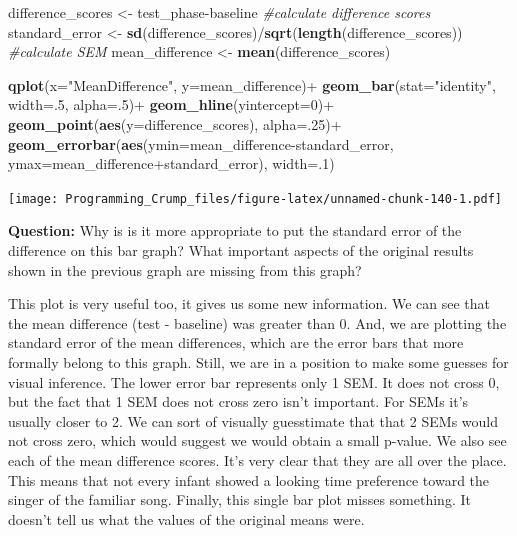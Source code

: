 \documentclass[]{book}
\newenvironment{Shaded}{\begin{snugshade}}{\end{snugshade}}
\newcommand{\KeywordTok}[1]{\textcolor[rgb]{0.13,0.29,0.53}{\textbf{{#1}}}}
\newcommand{\DataTypeTok}[1]{\textcolor[rgb]{0.13,0.29,0.53}{{#1}}}
\newcommand{\DecValTok}[1]{\textcolor[rgb]{0.00,0.00,0.81}{{#1}}}
\newcommand{\StringTok}[1]{\textcolor[rgb]{0.31,0.60,0.02}{{#1}}}
\newcommand{\CommentTok}[1]{\textcolor[rgb]{0.56,0.35,0.01}{\textit{{#1}}}}
\newcommand{\NormalTok}[1]{{#1}}
\theoremstyle{definition}
\theoremstyle{definition}
\theoremstyle{definition}
\theoremstyle{remark}
\begin{document}
\begin{Shaded}
\begin{Highlighting}[]
\NormalTok{difference_scores <-}\StringTok{ }\NormalTok{test_phase-baseline }\CommentTok{#calculate difference scores}
\NormalTok{standard_error <-}\StringTok{ }\KeywordTok{sd}\NormalTok{(difference_scores)/}\KeywordTok{sqrt}\NormalTok{(}\KeywordTok{length}\NormalTok{(difference_scores)) }\CommentTok{#calculate SEM}
\NormalTok{mean_difference <-}\StringTok{ }\KeywordTok{mean}\NormalTok{(difference_scores)}

\KeywordTok{qplot}\NormalTok{(}\DataTypeTok{x=}\StringTok{"MeanDifference"}\NormalTok{, }\DataTypeTok{y=}\NormalTok{mean_difference)+}
\StringTok{  }\KeywordTok{geom_bar}\NormalTok{(}\DataTypeTok{stat=}\StringTok{"identity"}\NormalTok{, }\DataTypeTok{width=}\NormalTok{.}\DecValTok{5}\NormalTok{, }\DataTypeTok{alpha=}\NormalTok{.}\DecValTok{5}\NormalTok{)+}
\StringTok{  }\KeywordTok{geom_hline}\NormalTok{(}\DataTypeTok{yintercept=}\DecValTok{0}\NormalTok{)+}
\StringTok{  }\KeywordTok{geom_point}\NormalTok{(}\KeywordTok{aes}\NormalTok{(}\DataTypeTok{y=}\NormalTok{difference_scores), }\DataTypeTok{alpha=}\NormalTok{.}\DecValTok{25}\NormalTok{)+}
\StringTok{  }\KeywordTok{geom_errorbar}\NormalTok{(}\KeywordTok{aes}\NormalTok{(}\DataTypeTok{ymin=}\NormalTok{mean_difference-standard_error, }
                                  \DataTypeTok{ymax=}\NormalTok{mean_difference+standard_error), }\DataTypeTok{width=}\NormalTok{.}\DecValTok{1}\NormalTok{)}
\end{Highlighting}
\end{Shaded}

\texttt{[image: Programming\_Crump\_files/figure-latex/unnamed-chunk-140-1.pdf]}

\textbf{Question:} Why is is it more appropriate to put the standard
error of the difference on this bar graph? What important aspects of the
original results shown in the previous graph are missing from this
graph?

This plot is very useful too, it gives us some new information. We can
see that the mean difference (test - baseline) was greater than 0. And,
we are plotting the standard error of the mean differences, which are
the error bars that more formally belong to this graph. Still, we are in
a position to make some guesses for visual inference. The lower error
bar represents only 1 SEM. It does not cross 0, but the fact that 1 SEM
does not cross zero isn't important. For SEMs it's usually closer to 2.
We can sort of visually guesstimate that that 2 SEMs would not cross
zero, which would suggest we would obtain a small p-value. We also see
each of the mean difference scores. It's very clear that they are all
over the place. This means that not every infant showed a looking time
preference toward the singer of the familiar song. Finally, this single
bar plot misses something. It doesn't tell us what the values of the
original means were.
\end{document}
